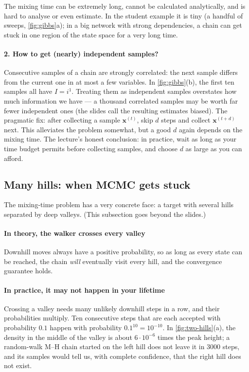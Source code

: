 \documentclass[11pt, oneside]{book}
\newcommand{\bx}{\mathbf{x}}  \newcommand{\by}{\mathbf{y}}
\let\originalsubsection\subsection
\renewcommand{\subsection}{\Needspace{6\baselineskip}\originalsubsection}
\begin{document}
The mixing time can be extremely long, cannot be calculated analytically, and
is hard to analyse or even estimate. In the student example it is tiny (a
handful of sweeps, \cref{fig:gibbs}a); in a big network with strong
dependencies, a chain can get stuck in one region of the state space for a
very long time.

\paragraph{2. How to get (nearly) independent samples?} Consecutive samples of
a chain are strongly correlated: the next sample differs from the current one
in at most a few variables. In \cref{fig:gibbs}(b), the first ten samples all
have $I = i^1$. Treating them as independent samples overstates how much
information we have --- a thousand correlated samples may be worth far fewer
independent ones (the slides call the resulting estimates biased). The pragmatic fix: after
collecting a sample $\bx^{(t)}$, skip $d$ steps and collect $\bx^{(t+d)}$ next.
This alleviates the problem somewhat, but a good $d$ again depends on the
mixing time. The lecture's honest conclusion: in practice, wait as long as
your time budget permits before collecting samples, and choose $d$ as large
as you can afford.

\subsection{Many hills: when MCMC gets stuck}
\label{sec:mcmc-multimodal}

The mixing-time problem has a very concrete face: a target with several hills
separated by deep valleys. (This subsection goes beyond the slides.)

\paragraph{In theory, the walker crosses every valley} Downhill moves always have
a positive probability, so as long as every state can be reached, the chain
\emph{will} eventually visit every hill, and the convergence guarantee holds.

\paragraph{In practice, it may not happen in your lifetime} Crossing a valley
needs many unlikely downhill steps in a row, and their probabilities
multiply. Ten consecutive steps that are each accepted with probability
$0.1$ happen with probability $0.1^{10} = 10^{-10}$. In
\cref{fig:two-hills}(a), the density in the middle of the valley is about
$6 \cdot 10^{-6}$ times the peak height; a random-walk M--H chain started on
the left hill does not leave it in 3000 steps, and its samples would tell us,
with complete confidence, that the right hill does not exist.
\end{document}
